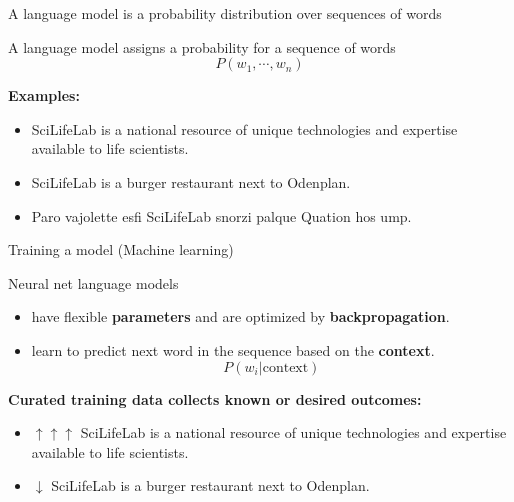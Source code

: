 \documentclass[10pt]{beamer}
\newcommand{\feature}[1]{{\color{scLime} \textbf{#1}}}
\begin{document}


\begin{frame}{A language model is a probability distribution over sequences of words}
		\begin{exampleblock}{A language model}
			assigns a probability for a sequence of words
			$$
			P(w_1, \cdots, w_{n})
			$$
		\end{exampleblock}
		\textbf{Examples:}
			\begin{itemize}
				\item SciLifeLab is a national resource of unique technologies and expertise available to life scientists.
				\item SciLifeLab is a burger restaurant next to Odenplan.
				\item Paro vajolette esfi SciLifeLab snorzi palque Quation hos ump.
			\end{itemize}
\end{frame}

\begin{frame}{Training a model (Machine learning)}
	\begin{exampleblock}{Neural net language models}
		\begin{itemize}
			\item have flexible \feature{parameters} and are optimized  by \feature{backpropagation}.
			\item learn to predict next word in the sequence based on the \feature{context}.
			$$
			P(w_{i}|{\mathrm  {context}})
			$$
		\end{itemize}
	\end{exampleblock}
	\textbf{Curated training data collects known or desired outcomes:}
	\begin{itemize}
		\item $\uparrow \uparrow \uparrow$ SciLifeLab is a national resource of unique technologies and expertise available to life scientists.
		\item $\downarrow$ SciLifeLab is a burger restaurant next to Odenplan.
	\end{itemize}
\end{frame}
\end{document}
